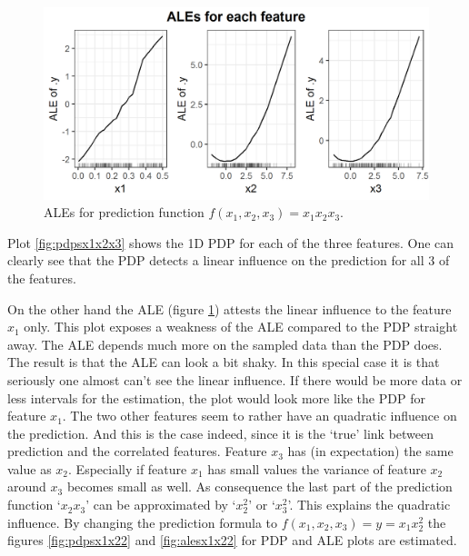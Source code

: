 \documentclass[
]{krantz}
\begin{document}
\begin{figure}
\includegraphics[width=1\linewidth]{images/ale_1_ALEs_x1x2x3_150_0_0p5_2_2} \caption{ALEs for prediction function \(f(x_1, x_2, x_3) = x_1 x_2 x_3\).}\label{fig:alesx1x2x3}
\end{figure}



Plot \ref{fig:pdpsx1x2x3} shows the 1D PDP for each of the three features. One can clearly see that the PDP detects a linear influence on the prediction for all 3 of the features.

On the other hand the ALE (figure \ref{fig:alesx1x2x3}) attests the linear influence to the feature \(x_1\) only. This plot exposes a weakness of the ALE compared to the PDP straight away. The ALE depends much more on the sampled data than the PDP does. The result is that the ALE can look a bit shaky. In this special case it is that seriously one almost can't see the linear influence. If there would be more data or less intervals for the estimation, the plot would look more like the PDP for feature \(x_1\). The two other features seem to rather have an quadratic influence on the prediction. And this is the case indeed, since it is the `true' link between prediction and the correlated features. Feature \(x_3\) has (in expectation) the same value as \(x_2\). Especially if feature \(x_1\) has small values the variance of feature \(x_2\) around \(x_3\) becomes small as well. As consequence the last part of the prediction function `\(x_2 x_3\)' can be approximated by `\(x_2^2\)' or `\(x_3^2\)'. This explains the quadratic influence. By changing the prediction formula to \(f(x_1, x_2, x_3) = y = x_1 x_2^2\) the figures \ref{fig:pdpsx1x22} and \ref{fig:alesx1x22} for PDP and ALE plots are estimated.
\end{document}
